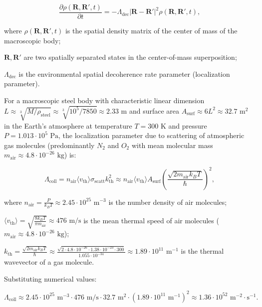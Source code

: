 \documentclass[11pt,a4paper]{article}
\theoremstyle{definition}
\begin{document}
\begin{equation}\label{eq:5.8}\tag{5.8}
\frac{\partial \rho(\mathbf{R}, \mathbf{R}', t)}{\partial t} = - \Lambda_{\text{dec}} |\mathbf{R} - \mathbf{R}'|^2 \rho(\mathbf{R}, \mathbf{R}', t),
\end{equation}

where $\rho(\mathbf{R}, \mathbf{R}', t)$ is the spatial density matrix of the center of mass of the macroscopic body;  

$\mathbf{R}, \mathbf{R}'$ are two spatially separated states in the center-of-mass superposition;  

$\Lambda_{\text{dec}}$ is the environmental spatial decoherence rate parameter (localization parameter).

For a macroscopic steel body with characteristic linear dimension $L \approx \sqrt[3]{M/\rho_{\text{steel}}} \approx \sqrt[3]{10^5 / 7850} \approx 2.33\text{ m}$ and surface area $A_{\text{surf}} \approx 6 L^2 \approx 32.7\text{ m}^2$ in the Earth's atmosphere at temperature $T = 300\text{ K}$ and pressure $P = 1.013 \cdot 10^5\text{ Pa}$, the localization parameter due to scattering of atmospheric gas molecules (predominantly $N_2$ and $O_2$ with mean molecular mass $m_{\text{air}} \approx 4.8 \cdot 10^{-26}\text{ kg}$) is:

\begin{equation}\label{eq:5.9}\tag{5.9}
\Lambda_{\text{coll}} = n_{\text{air}} \langle v_{\text{th}} \rangle \sigma_{\text{scatt}} k_{\text{th}}^2 \approx n_{\text{air}} \langle v_{\text{th}} \rangle A_{\text{surf}} \left( \frac{\sqrt{2 m_{\text{air}} k_B T}}{\hbar} \right)^2,
\end{equation}

where $n_{\text{air}} = \frac{P}{k_B T} \approx 2.45 \cdot 10^{25}\text{ m}^{-3}$ is the number density of air molecules;  

$\langle v_{\text{th}} \rangle = \sqrt{\frac{8 k_B T}{\pi m_{\text{air}}}} \approx 476\text{ m/s}$ is the mean thermal speed of air molecules ($m_{\text{air}} \approx 4.8 \cdot 10^{-26}\text{ kg}$);  

$k_{\text{th}} = \frac{\sqrt{2 m_{\text{air}} k_B T}}{\hbar} \approx \frac{\sqrt{2 \cdot 4.8 \cdot 10^{-26} \cdot 1.38 \cdot 10^{-23} \cdot 300}}{1.055 \cdot 10^{-34}} \approx 1.89 \cdot 10^{11}\text{ m}^{-1}$ is the thermal wavevector of a gas molecule.

Substituting numerical values:

\begin{equation}\label{eq:5.10}\tag{5.10}
\Lambda_{\text{coll}} \approx 2.45 \cdot 10^{25}\text{ m}^{-3} \cdot 476\text{ m/s} \cdot 32.7\text{ m}^2 \cdot (1.89 \cdot 10^{11}\text{ m}^{-1})^2 \approx 1.36 \cdot 10^{52}\text{ m}^{-2}\cdot\text{s}^{-1}.
\end{equation}
\end{document}
